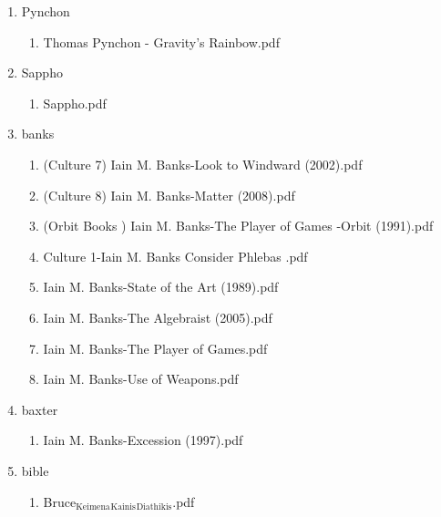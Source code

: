 \documentclass[11pt]{article}
\begin{document}
\begin{enumerate}
\item Pynchon
\label{sec-1-1-1-1-28-7}
\begin{enumerate}
\item Thomas Pynchon - Gravity's Rainbow.pdf
\label{sec-1-1-1-1-28-7-1}
\end{enumerate}

\item Sappho
\label{sec-1-1-1-1-28-8}
\begin{enumerate}
\item Sappho.pdf
\label{sec-1-1-1-1-28-8-1}
\end{enumerate}

\item banks
\label{sec-1-1-1-1-28-9}
\begin{enumerate}
\item (Culture 7) Iain M. Banks-Look to Windward (2002).pdf
\label{sec-1-1-1-1-28-9-1}

\item (Culture 8) Iain M. Banks-Matter (2008).pdf
\label{sec-1-1-1-1-28-9-2}

\item (Orbit Books ) Iain M. Banks-The Player of Games -Orbit (1991).pdf
\label{sec-1-1-1-1-28-9-3}

\item Culture 1-Iain M. Banks Consider Phlebas  .pdf
\label{sec-1-1-1-1-28-9-4}

\item Iain M. Banks-State of the Art (1989).pdf
\label{sec-1-1-1-1-28-9-5}

\item Iain M. Banks-The Algebraist (2005).pdf
\label{sec-1-1-1-1-28-9-6}

\item Iain M. Banks-The Player of Games.pdf
\label{sec-1-1-1-1-28-9-7}

\item Iain M. Banks-Use of Weapons.pdf
\label{sec-1-1-1-1-28-9-8}
\end{enumerate}

\item baxter
\label{sec-1-1-1-1-28-10}
\begin{enumerate}
\item Iain M. Banks-Excession (1997).pdf
\label{sec-1-1-1-1-28-10-1}
\end{enumerate}

\item bible
\label{sec-1-1-1-1-28-11}
\begin{enumerate}
\item Bruce$_{\text{Keimena}}$$_{\text{Kainis}}$$_{\text{Diathikis}}$.pdf
\label{sec-1-1-1-1-28-11-1}


\end{enumerate}
\end{enumerate}
\end{document}
